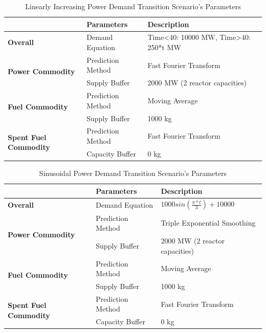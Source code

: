 \documentclass{anstrans}
\begin{document}
\begin{table}[!htbp]
    \centering
    \caption {Linearly Increasing Power Demand Transition Scenario's Parameters}
	\label{tab:transition-scenario-growing-power}
    \begin{tabular}{|l|l|p{4.5cm}|}
    \hline
                                     & \textbf{Parameters}    & \textbf{Description} \\ \hline
    \textbf{Overall}& Demand Equation & Time<40: 10000 MW, Time>40: 250*t MW \\ \hline
    \multirow{2}{*}{\textbf{Power Commodity}} & Prediction Method      &  Fast Fourier Transform \\ \cline{2-3} 
                                     & Supply Buffer          &  2000 MW (2 reactor capacities)\\ \hline
    \multirow{2}{*}{\textbf{Fuel Commodity}}  & Prediction Method      &  Moving Average\\ \cline{2-3}
                                     & Supply Buffer & 1000 kg \\ \hline
    \multirow{2}{*}{\textbf{Spent Fuel Commodity}}  & Prediction Method      &  Fast Fourier Transform \\ \cline{2-3}
                                     & Capacity Buffer & 0 kg \\ \hline
    \end{tabular}
\end{table}

\begin{table}[!htbp]
    \centering
    \caption {Sinusoidal Power Demand Transition Scenario's Parameters}
	\label{tab:transition-scenario-sine-power}
    \begin{tabular}{|l|l|p{4.5cm}|}
    \hline
                                     & \textbf{Parameters}    & \textbf{Description} \\ \hline
    \textbf{Overall}& Demand Equation & $1000sin(\frac{\pi*t}{3})+10000$ \\ \hline
    \multirow{2}{*}{\textbf{Power Commodity}} & Prediction Method      &  Triple Exponential Smoothing \\ \cline{2-3} 
                                     & Supply Buffer          &  2000 MW (2 reactor capacities)\\ \hline
    \multirow{2}{*}{\textbf{Fuel Commodity}}  & Prediction Method      &  Moving Average\\ \cline{2-3}
                                     & Supply Buffer & 1000 kg \\ \hline
    \multirow{2}{*}{\textbf{Spent Fuel Commodity}}  & Prediction Method      & Fast Fourier Transform\\ \cline{2-3}
                                     & Capacity Buffer & 0 kg \\ \hline
    \end{tabular}
\end{table}
\end{document}
